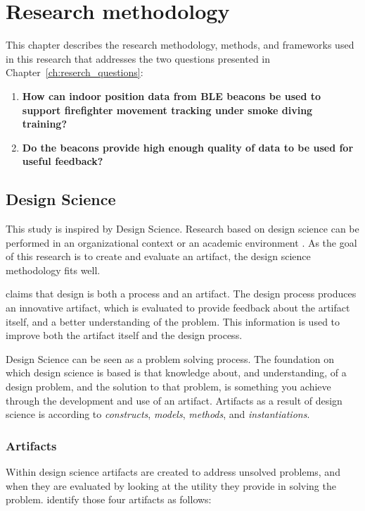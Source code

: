 \documentclass[../Main/thesis.tex]{subfiles}
\begin{document}
\chapter{Research methodology}
\label{ch:research_methodology}
This chapter describes the research methodology, methods, and frameworks used in this research that addresses the two questions presented in Chapter~\ref{ch:reserch_questions}:

\begin{enumerate}
	\item \textbf{How can indoor position data from BLE beacons be used to support firefighter movement tracking under smoke diving training?}
	\item \textbf{Do the beacons provide high enough quality of data to be used for useful feedback?}
\end{enumerate}

\section{Design Science}
This study is inspired by Design Science.
Research based on design science can be performed in an organizational context or an academic environment \citep{lacerda2015design}.
As the goal of this research is to create and evaluate an artifact, the design science methodology fits well.

\citet{hevner2004design} claims that design is both a process and an artifact.
The design process produces an innovative artifact, which is evaluated to provide feedback about the artifact itself, and a better understanding of the problem. 
This information is used to improve both the artifact itself and the design process.

Design Science can be seen as a problem solving process.
The foundation on which design science is based is that knowledge about, and understanding, of a design problem, and the solution to that problem, is something you achieve through the development and use of an artifact.
Artifacts as a result of design science is according to \citet{March1995} \textit{constructs}, \textit{models}, \textit{methods}, and \textit{instantiations}.

\subsection{Artifacts}
Within design science artifacts are created to address unsolved problems, and when they are evaluated by looking at the utility they provide in solving the problem.
\citet[p.78-79]{hevner2004design} identify those four artifacts as follows:
\end{document}
